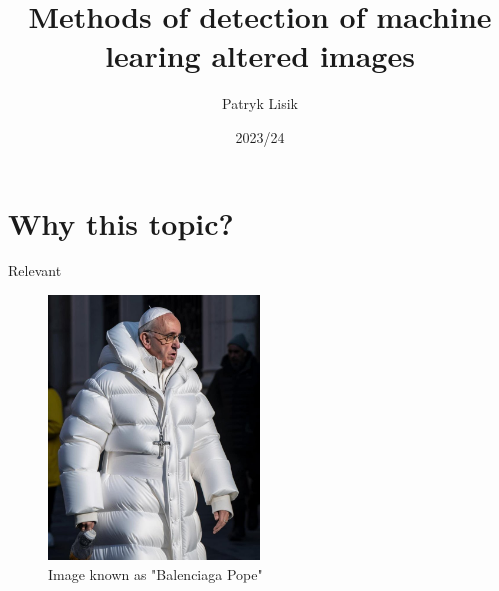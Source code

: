 \documentclass[xcolor=table]{beamer}
\title[AI altering image detection]{Methods of detection of machine learing altered images }%
\author{Patryk Lisik } %
\institute[] %
{
 Uniwersytet Łódzki \\ %
}
\date{2023/24}
\begin{document}
\begin{frame}
\titlepage


\end{frame}

\section{Why this topic?}

\begin{frame}{Relevant}
    \begin{figure}
        \centering
        \includegraphics[width=0.5\textwidth]{img/pope_balenciaga.jpg}
        \caption{Image known as  "Balenciaga Pope"}
        \label{fig:balenciaga-pope}
    \end{figure}
\end{frame}
\end{document}
